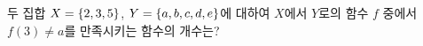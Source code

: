 두 집합 $X=\{2{,}\mkern3mu\mathopen{}3{,}\mkern3mu\mathopen{}5\}$, $Y=\{a{,}\mkern3mu\mathopen{}b{,}\mkern3mu\mathopen{}c{,}\mkern3mu\mathopen{}d{,}\mkern3mu\mathopen{}e\}$에 대하여 $X$에서 $Y$로의 함수 $f$ 중에서 $f(3)\ne a$를 만족시키는 함수의 개수는?
